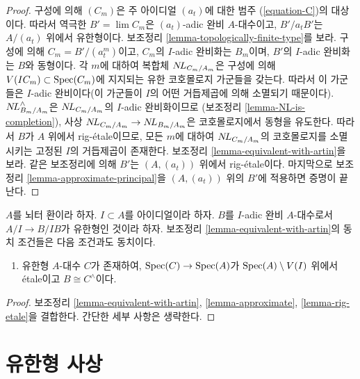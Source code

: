 \begin{proof}
\medskip\noindent
구성에 의해 $(C_m)$은 주 아이디얼 $(a_t)$에 대한 범주
(\ref{equation-C})의 대상이다.
따라서 역극한 $B' = \lim C_m$은 $(a_t)$-adic 완비 $A$-대수이고,
$B'/a_t B'$는 $A/(a_t)$ 위에서 유한형이다.
보조정리 \ref{lemma-topologically-finite-type}를 보라.
구성에 의해 $C_m = B'/(a_t^m)$이고, $C_m$의 $I$-adic 완비화는 $B_m$이며,
$B'$의 $I$-adic 완비화는 $B$와 동형이다.
각 $m$에 대하여 복합체 $\mathop{N\!L}\nolimits_{C_m/A_m}$은 구성에 의해
$V(IC_m) \subset \mathop{\mathrm{Spec}}(C_m)$에 지지되는 유한 코호몰로지 가군들을 갖는다.
따라서 이 가군들은 $I$-adic 완비이다(이 가군들이 $I$의 어떤 거듭제곱에 의해
소멸되기 때문이다).
$\mathop{N\!L}\nolimits^\wedge_{B_m/A_m}$은 $\mathop{N\!L}\nolimits_{C_m/A_m}$의 $I$-adic 완비화이므로
(보조정리 \ref{lemma-NL-is-completion}),
사상 $\mathop{N\!L}\nolimits_{C_m/A_m} \to \mathop{N\!L}\nolimits_{B_m/A_m}$은 코호몰로지에서 동형을 유도한다.
따라서 $B$가 $A$ 위에서 rig-\'etale이므로, 모든 $m$에 대하여
$\mathop{N\!L}\nolimits_{C_m/A_m}$의 코호몰로지를 소멸시키는 고정된 $I$의 거듭제곱이 존재한다.
보조정리 \ref{lemma-equivalent-with-artin}을 보라.
같은 보조정리에 의해 $B'$는 $(A, (a_t))$ 위에서 rig-\'etale이다.
마지막으로 보조정리 \ref{lemma-approximate-principal}을
$(A, (a_t))$ 위의 $B'$에 적용하면 증명이 끝난다.
\end{proof}

\begin{lemma}
\label{lemma-approximate-by-etale-over-complement}
$A$를 뇌터 환이라 하자. $I \subset A$를 아이디얼이라 하자.
$B$를 $I$-adic 완비 $A$-대수로서 $A/I \to B/IB$가 유한형인 것이라 하자.
보조정리 \ref{lemma-equivalent-with-artin}의 동치 조건들은
다음 조건과도 동치이다.
\begin{enumerate}
\item[(8)]
\label{item-algebraize}
유한형 $A$-대수 $C$가 존재하여,
$\mathop{\mathrm{Spec}}(C) \to \mathop{\mathrm{Spec}}(A)$가 $\mathop{\mathrm{Spec}}(A) \setminus V(I)$ 위에서 \'etale이고
$B \cong C^\wedge$이다.
\end{enumerate}
\end{lemma}

\begin{proof}
보조정리 \ref{lemma-equivalent-with-artin}, \ref{lemma-approximate},
\ref{lemma-rig-etale}을 결합한다. 간단한 세부 사항은 생략한다.
\end{proof}


\section{유한형 사상}
\label{section-finite-type}

